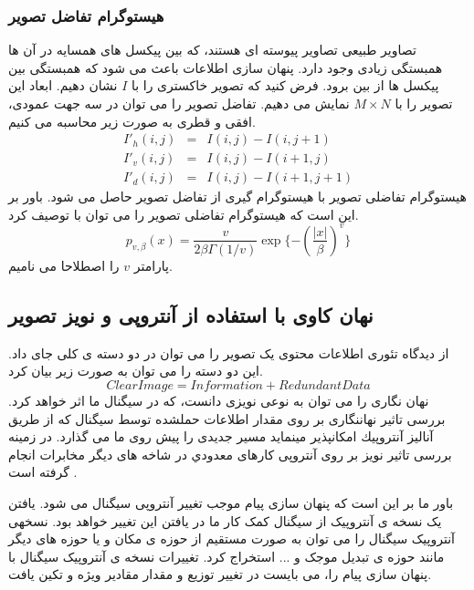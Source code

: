 \subsubsection{هیستوگرام تفاضل تصویر}
تصاویر طبیعی تصاویر پیوسته ای هستند، که بین پیکسل های همسایه در آن ها همبستگی زیادی وجود دارد. پنهان سازی اطلاعات باعث می شود که همبستگی بین پیکسل ها از بین برود. فرض کنید که تصویر خاکستری را با $ I $ نشان دهیم. ابعاد این تصویر را با $ M\times N $ نمایش می دهیم. تفاضل تصویر را می توان در سه جهت عمودی، افقی و قطری به صورت زیر محاسبه می کنیم.
\begin{eqnarray}
I'_{h}(i,j)&=&I(i,j)-I(i,j+1)\nonumber\\
I'_{v}(i,j)&=&I(i,j)-I(i+1,j)\nonumber\\
I'_{d}(i,j)&=&I(i,j)-I(i+1,j+1)
\end{eqnarray}
هیستوگرام تفاضلی تصویر با هیستوگرام گیری از تفاضل تصویر حاصل می شود. باور بر این است که هیستوگرام تفاضلی تصویر را می توان با {} توصیف کرد. 
\begin{equation}
p_{v,\beta }(x)=\frac{v}{2\beta\Gamma (1/v)}\exp \lbrace -(\frac{|x|}{\beta } )^{v} \rbrace 
\end{equation}
پارامتر $ v $ را اصطلاحا {} می نامیم. 

 
\subsection{نهان کاوی با استفاده از آنتروپی و نویز تصویر }
از دیدگاه تئوری اطلاعات محتوی یک تصویر را می توان در دو دسته ی کلی جای داد. این دو دسته را می توان به صورت زیر بیان کرد.
\begin{equation}
ClearImage = Information+Redundant Data
\end{equation}
نهان نگاری را می توان به نوعی نویزی دانست، که در سیگنال ما اثر خواهد کرد. بررسی تاثیر نهان­نگاری بر روی مقدار اطلاعات حمل­شده توسط سیگنال كه از طريق آناليز آنتروپیك امكان­پذير مي­نمايد مسیر جدیدی را پیش روی ما می گذارد. در زمینه بررسی تاثیر نویز بر روی آنتروپی کارهای معدودي در شاخه های دیگر مخابرات انجام گرفته است \cite{Narayanan2001}. 

باور ما بر این است که پنهان سازی پیام موجب تغییر آنتروپی سیگنال می شود. یافتن یک نسخه ی آنتروپیک از سیگنال کمک کار ما در یافتن این تغییر خواهد بود. نسخه­ی آنتروپیک سیگنال را می توان به صورت مستقیم از حوزه ی مکان و یا حوزه های دیگر مانند حوزه ی تبدیل موجک و ... استخراج کرد. تغییرات نسخه ی آنتروپیک سیگنال با پنهان سازی پیام را، می بایست در تغییر توزیع و مقدار مقادیر ویژه و تکین یافت.

